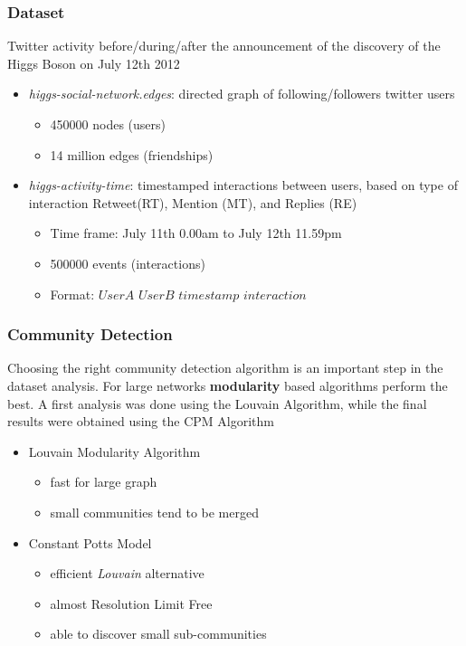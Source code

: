 \documentclass{beamer}
\begin{document}
\begin{frame}
\frametitle{Dataset}
Twitter activity before/during/after the announcement of the discovery of the Higgs Boson on July 12th 2012


\begin{itemize}
	\item \textit{higgs-social-network.edges}: directed graph of following/followers twitter users
	\begin{itemize}
		\item 450000 nodes (users)
		\item 14 million edges (friendships)
	\end{itemize}
	\item \textit{higgs-activity-time}: timestamped interactions between users, based on type of interaction Retweet(RT), Mention (MT), and Replies (RE) 
	\begin{itemize}
		\item Time frame: July 11th 0.00am to July 12th 11.59pm
		\item 500000 events (interactions)
		\item Format: $UserA$ $UserB$ $timestamp$ $interaction$
	\end{itemize}
\end{itemize}
\end{frame}


\begin{frame}
\frametitle{Community Detection}
Choosing the right community detection algorithm is an important step in the dataset analysis. For large networks \textbf{modularity} based algorithms perform the best. A first analysis was done using the Louvain Algorithm, while the final results were obtained using the CPM Algorithm


\begin{itemize}
	\item Louvain Modularity Algorithm\footnotemark
	\begin{itemize}
		\item fast for large graph
		\item small communities tend to be merged
	\end{itemize}
	\item Constant Potts Model\footnotemark
	\begin{itemize}
		\item efficient \textit{Louvain} alternative
		\item almost Resolution Limit Free
		\item able to discover small sub-communities
	\end{itemize}
\end{itemize}
\end{frame}
\end{document}
